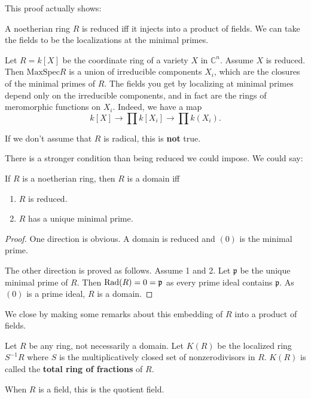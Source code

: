 This proof actually shows:
\begin{proposition}[Scholism] A noetherian ring $R$ is reduced iff it injects
into a product of fields. We can take the fields to be the localizations at the
minimal primes.
\end{proposition}

\begin{example}
Let $R = k[X]$ be the coordinate ring of a variety $X$ in
$\mathbb{C}^n$. Assume $X$ is
reduced. Then $\mathrm{MaxSpec} R$ is a union of irreducible components
$X_i$, which
are the closures of the minimal primes of $R$. The fields you get by localizing
at minimal primes depend only on the irreducible components, and in fact are
the rings of meromorphic functions on $X_i$.
Indeed, we have a map
\[ k[X] \to \prod k[X_i] \to \prod k(X_i).  \]

If we don't assume that $R$ is radical, this is \textbf{not} true.
\end{example}

There is a stronger condition than being reduced we could impose. We could say:

\begin{proposition}
If $R$ is a noetherian ring, then $R$ is a domain iff
\begin{enumerate}
\item $R$ is reduced.
\item $R$ has a unique minimal prime.
\end{enumerate}
\end{proposition}
\begin{proof}
One direction is obvious. A domain is reduced and $(0)$ is the minimal prime.

The other direction is proved as follows. Assume 1 and 2. Let $\mathfrak{p}$ be
the unique minimal prime of $R$. Then $\operatorname{Rad} (R) = 0 = \mathfrak{p}$ as every
prime ideal contains $\mathfrak{p}$. As $(0)$ is a prime ideal, $R$ is
a domain.
\end{proof}

We close by making some remarks about this embedding of $R$ into a product of
fields.

\begin{definition}
Let $R$ be any ring, not necessarily a domain. Let $K(R)$ be the localized ring
$S^{-1}R$ where $S$ is the multiplicatively closed set of nonzerodivisors in
$R$.  $K(R)$ is called the \textbf{total ring of fractions} of $R$.

When $R$ is a field, this is the quotient field.
\end{definition}

